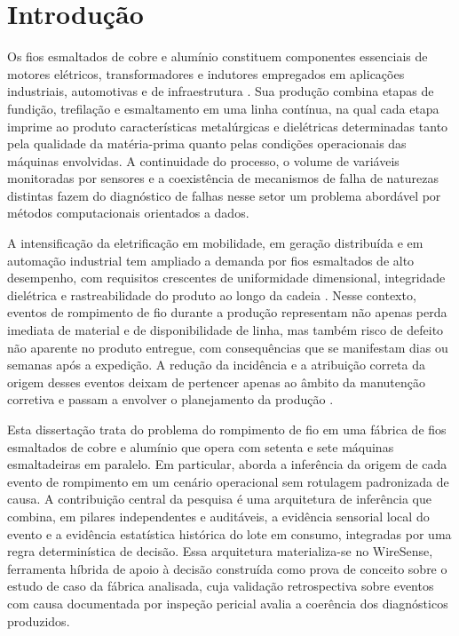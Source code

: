 \chapter{Introdução}
\label{cap:introducao}


Os fios esmaltados de cobre e alumínio constituem componentes essenciais de motores elétricos, transformadores e indutores empregados em aplicações industriais, automotivas e de infraestrutura \cite{demiri2014enamel,wright2011wire}. Sua produção combina etapas de fundição, trefilação e esmaltamento em uma linha contínua, na qual cada etapa imprime ao produto características metalúrgicas e dielétricas determinadas tanto pela qualidade da matéria-prima quanto pelas condições operacionais das máquinas envolvidas. A continuidade do processo, o volume de variáveis monitoradas por sensores e a coexistência de mecanismos de falha de naturezas distintas fazem do diagnóstico de falhas nesse setor um problema abordável por métodos computacionais orientados a dados.

A intensificação da eletrificação em mobilidade, em geração distribuída e em automação industrial tem ampliado a demanda por fios esmaltados de alto desempenho, com requisitos crescentes de uniformidade dimensional, integridade dielétrica e rastreabilidade do produto ao longo da cadeia \cite{glaessel2022hairpin}. Nesse contexto, eventos de rompimento de fio durante a produção representam não apenas perda imediata de material e de disponibilidade de linha, mas também risco de defeito não aparente no produto entregue, com consequências que se manifestam dias ou semanas após a expedição. A redução da incidência e a atribuição correta da origem desses eventos deixam de pertencer apenas ao âmbito da manutenção corretiva e passam a envolver o planejamento da produção \cite{karabay2018failure}.

Esta dissertação trata do problema do rompimento de fio em uma fábrica de fios esmaltados de cobre e alumínio que opera com setenta e sete máquinas esmaltadeiras em paralelo. Em particular, aborda a inferência da origem de cada evento de rompimento em um cenário operacional sem rotulagem padronizada de causa. A contribuição central da pesquisa é uma arquitetura de inferência que combina, em pilares independentes e auditáveis, a evidência sensorial local do evento e a evidência estatística histórica do lote em consumo, integradas por uma regra determinística de decisão. Essa arquitetura materializa-se no WireSense, ferramenta híbrida de apoio à decisão construída como prova de conceito sobre o estudo de caso da fábrica analisada, cuja validação retrospectiva sobre eventos com causa documentada por inspeção pericial avalia a coerência dos diagnósticos produzidos.

